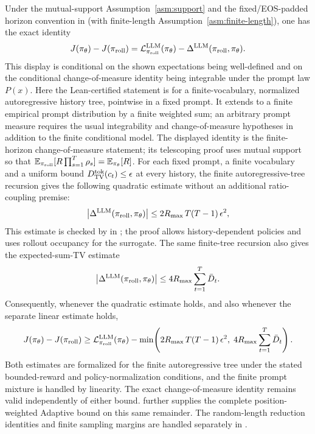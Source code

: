 \begin{remark}
\label{rem:fh-tr-bound}
Under the mutual-support Assumption~\ref{asm:support} and the fixed/EOS-padded horizon convention in
 (with finite-length Assumption~\ref{asm:finite-length}), one has the exact identity
\begin{equation*}
    J(\pi_{\theta}) - J(\pi_{\mathrm{roll}})
    =
    \mathcal{L}_{\pi_{\mathrm{roll}}}^{\mathrm{LLM}}(\pi_{\theta})
    -
    \Delta^{\mathrm{LLM}}(\pi_{\mathrm{roll}},\pi_{\theta}).
\end{equation*}
This display is conditional on the shown expectations being well-defined and on the
conditional change-of-measure identity being integrable under the prompt law $P(x)$.
Here the Lean-certified statement is for a finite-vocabulary, normalized
autoregressive history tree, pointwise in a fixed prompt. It extends to a
finite empirical prompt distribution by a finite weighted sum;
an arbitrary prompt measure requires the usual integrability and change-of-measure hypotheses in addition to the finite conditional model.
The displayed identity is the finite-horizon change-of-measure statement; its telescoping proof uses mutual support so that
\(\mathbb{E}_{\pi_{\mathrm{roll}}}[R\prod_{s=1}^{T}\rho_s]=\mathbb{E}_{\pi_{\theta}}[R]\). For each fixed prompt, a finite vocabulary and a uniform bound
\(D_{\mathrm{TV}}^{\mathrm{tok}}(c_t)\le\epsilon\) at every history, the finite autoregressive-tree recursion gives the following quadratic estimate
without an additional ratio-coupling premise:
\begin{equation*}
    \bigl|\Delta^{\mathrm{LLM}}(\pi_{\mathrm{roll}},\pi_{\theta})\bigr|
    \le
    2R_{\max}\,T(T-1)\,\epsilon^2,
\end{equation*}
This estimate is checked by  in
; the proof allows history-dependent policies and uses rollout occupancy for the
surrogate. The same finite-tree recursion also gives the expected-sum-TV estimate
\begin{equation*}
    \bigl|\Delta^{\mathrm{LLM}}(\pi_{\mathrm{roll}},\pi_{\theta})\bigr|
    \le
    4R_{\max}\sum_{t=1}^{T}\bar{D}_t.
\end{equation*}
Consequently, whenever the quadratic estimate holds, and also whenever the separate linear estimate holds,
\begin{equation*}
    J(\pi_{\theta}) - J(\pi_{\mathrm{roll}})
    \ge
    \mathcal{L}_{\pi_{\mathrm{roll}}}^{\mathrm{LLM}}(\pi_{\theta})
    -
    \min\!\left(
        2R_{\max}\,T(T-1)\,\epsilon^2,\;
        4R_{\max}\sum_{t=1}^{T}\bar{D}_t
    \right).
\end{equation*}
Both estimates are formalized for the finite autoregressive tree under the stated bounded-reward and policy-normalization
conditions, and the finite prompt mixture is handled by linearity. The exact change-of-measure identity remains valid independently
of either bound.  further supplies the complete
position-weighted Adaptive bound on this same remainder. The random-length
reduction identities and finite sampling margins are handled separately in
.
\end{remark}

